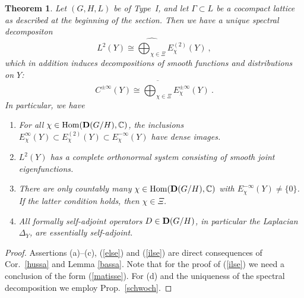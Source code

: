 \documentclass[10]{amsart}
\newtheorem{thm}{Theorem}[section]
\theoremstyle{remark}
\theoremstyle{definition}
\numberwithin{equation}{section}
\newcommand{\C}{\mathbb{C}}           %
\newcommand{\Hom}{\mathrm{Hom}}
\newcommand{\be}{\begin{equation}}
\newcommand{\defn}{{:=}}
\begin{document}
{\begin{thm}\label{selim}
Let $(G,H,L)$ be of Type~I, and let $\Gamma\subset L$ be a cocompact lattice as described at the beginning of the section. Then we have a unique spectral decompositon
\be\label{else}
L^2(Y)\cong \widehat{\bigoplus_{\chi\in\Xi}} {E}_\chi^{(2)}(Y)\ ,
\end{equation}
which in addition induces decompositions of smooth functions and distributions on $Y$:
\be\label{ilse}
C^{\pm\infty}(Y)\cong\overline{\bigoplus_{\chi\in\Xi}} {E}_\chi^{\pm\infty}(Y)\ .
\end{equation}
In particular, we have
\begin{enumerate}
\item For all $\chi\in\Hom({\bf D}(G/H),\C)$, the inclusions ${E}_\chi^{\infty}(Y)\subset {E}_\chi^{(2)}(Y)\subset {E}_\chi^{-\infty}(Y)$ have dense images.
\item $L^2(Y)$ has a complete orthonormal system consisting of smooth joint eigenfunctions.
\item There are only countably many $\chi\in\Hom({\bf D}(G/H),\C)$ with ${E}_\chi^{-\infty}(Y)\ne\{0\}$. If the latter condition holds, then $\chi\in\Xi$.
\item All formally self-adjoint operators $D\in {\bf D}(G/H)$, in particular the Laplacian $\Delta_Y$, are essentially self-adjoint.
\end{enumerate}
\end{thm}

\begin{proof} Assertions (a)--(c), (\ref{else}) and (\ref{ilse}) are  direct consequences  of Cor.~\ref{hussa} and Lemma \ref{bassa}. Note that for the proof of  (\ref{ilse})
we need a conclusion of the form (\ref{matisse}). For (d) and the uniqueness of the spectral decomposition we  employ Prop.~\ref{schwoch}. 
\end{proof}


}
\end{document}
